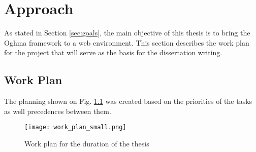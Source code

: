 \chapter{Approach}\label{chap:approach}

As stated in Section \ref{sec:goals}, the main objective of this thesis is to bring the Oghma framework to a web environment. This section describes the work plan for the project that will serve as the basis for the dissertation writing.


\section{Work Plan}\label{sec:work_plan}

The planning shown on Fig. \ref{fig:work_plan} was created based on the priorities of the tasks as well precedences between them.

\begin{figure}[H]
  \texttt{[image: work\_plan\_small.png]}
  \caption{Work plan for the duration of the thesis}
  \label{fig:work_plan}
\end{figure}

